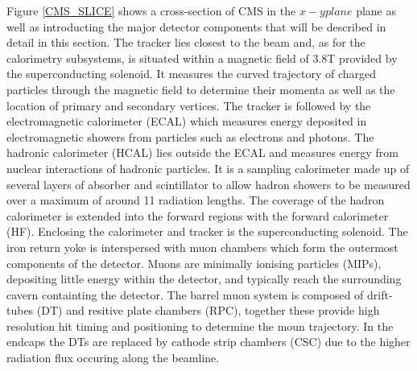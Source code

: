 Figure \ref{CMS_SLICE} shows a cross-section of CMS in the $x-y plane$ plane as well as introducting the major detector components that will be described 
in detail in this section. The tracker lies closest to the beam and, as for the calorimetry subsystems, is situated within a magnetic field of 3.8T provided
by the superconducting solenoid. It measures the curved trajectory of charged particles through the magnetic field to determine their momenta 
as well as the location of primary and secondary vertices. The tracker is followed by the electromagnetic calorimeter (ECAL)
which measures energy deposited in electromagnetic showers from particles such as electrons and photons. The hadronic calorimeter
(HCAL) lies outside the ECAL and measures energy from nuclear interactions of hadronic particles. It is a sampling calorimeter
made up of several layers of absorber and scintillator to allow hadron showers 
to be measured over a maximum of around 11 radiation lengths. The coverage of the hadron calorimeter is extended into the 
forward regions with the forward calorimeter (HF). Enclosing the calorimeter and tracker is the superconducting solenoid. The iron return
yoke is interspersed with muon chambers which form the outermost components of the detector. Muons are minimally ionising particles (MIPs),
depositing little energy within the detector, and typically reach the surrounding cavern containting the detector. The barrel muon system
is composed of drift-tubes (DT) and resitive plate chambers (RPC), together these provide high resolution hit timing and positioning to determine
the moun trajectory. In the endcaps the DTs are replaced by cathode strip chambers (CSC) due to the higher radiation flux occuring
along the beamline. 

